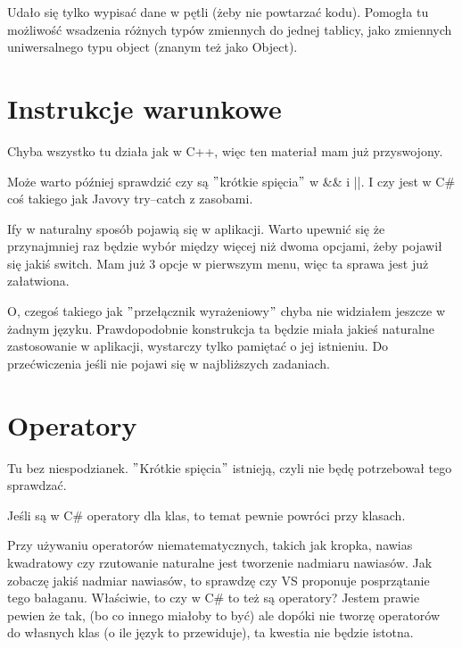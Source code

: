 \documentclass[10pt]{article}
\begin{document}
Udało się tylko wypisać dane w pętli (żeby nie powtarzać kodu). Pomogła tu możliwość wsadzenia różnych typów zmiennych do jednej tablicy, jako zmiennych uniwersalnego typu object (znanym też jako Object).

\section{Instrukcje warunkowe}
Chyba wszystko tu działa jak w C++, więc ten materiał mam już przyswojony.

Może warto później sprawdzić czy są $"$krótkie spięcia$"$ w \&\& i ||. I czy jest w C\# coś takiego jak Javovy try--catch z zasobami.

Ify w naturalny sposób pojawią się w aplikacji. Warto upewnić się że przynajmniej raz będzie wybór między więcej niż dwoma opcjami, żeby pojawił się jakiś switch. Mam już 3 opcje w pierwszym menu, więc ta sprawa jest już załatwiona.

O, czegoś takiego jak $"$przełącznik wyrażeniowy$"$ chyba nie widziałem jeszcze w żadnym języku. Prawdopodobnie konstrukcja ta będzie miała jakieś naturalne zastosowanie w aplikacji, wystarczy tylko pamiętać o jej istnieniu. Do przećwiczenia jeśli nie pojawi się w najbliższych zadaniach.

\section{Operatory}
Tu bez niespodzianek. $"$Krótkie spięcia$"$ istnieją, czyli nie będę potrzebował tego sprawdzać.

Jeśli są w C\# operatory dla klas, to temat pewnie powróci przy klasach.

Przy używaniu operatorów niematematycznych, takich jak kropka, nawias kwadratowy czy rzutowanie naturalne jest tworzenie nadmiaru nawiasów. Jak zobaczę jakiś nadmiar nawiasów, to sprawdzę czy VS proponuje posprzątanie tego bałaganu. Właściwie, to czy w C\# to też są operatory? Jestem prawie pewien że tak, (bo co innego miałoby to być) ale dopóki nie tworzę operatorów do własnych klas (o ile język to przewiduje), ta kwestia nie będzie istotna.
\end{document}
